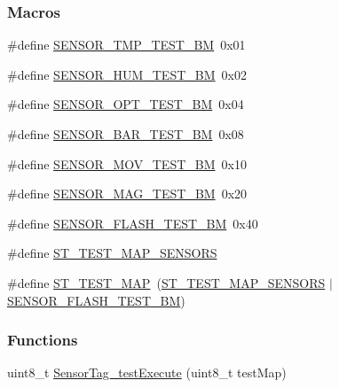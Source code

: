 \subsubsection*{Macros}
\begin{DoxyCompactItemize}
\item 
\#define \hyperlink{_sensor_tag_test_8h_a1a42d13a848423fea94ccbada972a063}{S\+E\+N\+S\+O\+R\+\_\+\+T\+M\+P\+\_\+\+T\+E\+S\+T\+\_\+\+B\+M}~0x01
\item 
\#define \hyperlink{_sensor_tag_test_8h_a595446a93d8ae4e6eeb4629d8b46027c}{S\+E\+N\+S\+O\+R\+\_\+\+H\+U\+M\+\_\+\+T\+E\+S\+T\+\_\+\+B\+M}~0x02
\item 
\#define \hyperlink{_sensor_tag_test_8h_a9c8183e91412dfb80f5c950e6f9e99a0}{S\+E\+N\+S\+O\+R\+\_\+\+O\+P\+T\+\_\+\+T\+E\+S\+T\+\_\+\+B\+M}~0x04
\item 
\#define \hyperlink{_sensor_tag_test_8h_a2a951beaea908e5c6b1962cb7ff17b28}{S\+E\+N\+S\+O\+R\+\_\+\+B\+A\+R\+\_\+\+T\+E\+S\+T\+\_\+\+B\+M}~0x08
\item 
\#define \hyperlink{_sensor_tag_test_8h_ab56aad78a7c906e9ab7f470730ca2db9}{S\+E\+N\+S\+O\+R\+\_\+\+M\+O\+V\+\_\+\+T\+E\+S\+T\+\_\+\+B\+M}~0x10
\item 
\#define \hyperlink{_sensor_tag_test_8h_a98a820de4242dd80162fb34efb98a750}{S\+E\+N\+S\+O\+R\+\_\+\+M\+A\+G\+\_\+\+T\+E\+S\+T\+\_\+\+B\+M}~0x20
\item 
\#define \hyperlink{_sensor_tag_test_8h_a5d48b2aa108249264a00dcef3a57462f}{S\+E\+N\+S\+O\+R\+\_\+\+F\+L\+A\+S\+H\+\_\+\+T\+E\+S\+T\+\_\+\+B\+M}~0x40
\item 
\#define \hyperlink{_sensor_tag_test_8h_a3afd55a27da5a1481ceefce7711898b5}{S\+T\+\_\+\+T\+E\+S\+T\+\_\+\+M\+A\+P\+\_\+\+S\+E\+N\+S\+O\+R\+S}
\item 
\#define \hyperlink{_sensor_tag_test_8h_a6e892f1693a7e556da35f9d5b42e318c}{S\+T\+\_\+\+T\+E\+S\+T\+\_\+\+M\+A\+P}~(\hyperlink{_sensor_tag_test_8h_a3afd55a27da5a1481ceefce7711898b5}{S\+T\+\_\+\+T\+E\+S\+T\+\_\+\+M\+A\+P\+\_\+\+S\+E\+N\+S\+O\+R\+S} $\vert$ \hyperlink{_sensor_tag_test_8h_a5d48b2aa108249264a00dcef3a57462f}{S\+E\+N\+S\+O\+R\+\_\+\+F\+L\+A\+S\+H\+\_\+\+T\+E\+S\+T\+\_\+\+B\+M})
\end{DoxyCompactItemize}
\subsubsection*{Functions}
\begin{DoxyCompactItemize}
\item 
uint8\+\_\+t \hyperlink{_sensor_tag_test_8h_a3ecca7f85a2e70c29373aff1d7de9aaa}{Sensor\+Tag\+\_\+test\+Execute} (uint8\+\_\+t test\+Map)
\end{DoxyCompactItemize}


